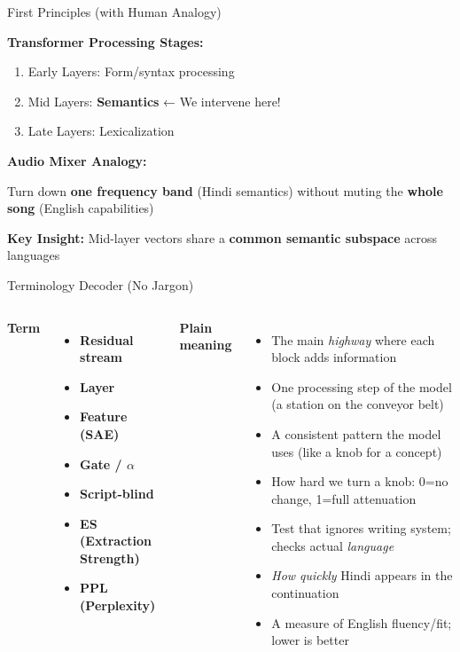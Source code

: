 \documentclass[aspectratio=169]{beamer}
\begin{document}
\begin{frame}{First Principles (with Human Analogy)}

\textbf{Transformer Processing Stages:}

\begin{enumerate}
  \item \textcolor{mBlue}{Early Layers:} Form/syntax processing
  \item \textcolor{mGreen}{Mid Layers:} \textbf{Semantics} ← \textcolor{mOrange}{We intervene here!}
  \item \textcolor{mBlue}{Late Layers:} Lexicalization
\end{enumerate}

\vspace{5mm}

\textbf{Audio Mixer Analogy:}

Turn down \textbf{one frequency band} (Hindi semantics) without muting the \textbf{whole song} (English capabilities)

\vspace{5mm}

\textcolor{mBlue}{\textbf{Key Insight:}} Mid-layer vectors share a \textbf{common semantic subspace} across languages

\end{frame}

\begin{frame}{Terminology Decoder (No Jargon)}
\small
\begin{columns}[T]
\textbf{Term}
\begin{itemize}
  \item \textbf{Residual stream}
  \item \textbf{Layer}
  \item \textbf{Feature (SAE)}
  \item \textbf{Gate / $\alpha$}
  \item \textbf{Script-blind}
  \item \textbf{ES (Extraction Strength)}
  \item \textbf{PPL (Perplexity)}
\end{itemize}

\textbf{Plain meaning}
\begin{itemize}
  \item The main \emph{highway} where each block adds information
  \item One processing step of the model (a station on the conveyor belt)
  \item A consistent pattern the model uses (like a knob for a concept)
  \item How hard we turn a knob: 0{=}no change, 1{=}full attenuation
  \item Test that ignores writing system; checks actual \emph{language}
  \item \emph{How quickly} Hindi appears in the continuation
  \item A measure of English fluency/fit; lower is better
\end{itemize}
\end{columns}
\end{frame}
\end{document}
